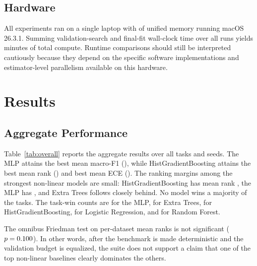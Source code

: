 \documentclass{ieeeaccess}
\begin{document}
\subsection{Hardware}
All experiments ran on a single \HardwareCPU{} laptop with \HardwareRAM{} of unified memory running macOS 26.3.1. Summing validation-search and final-fit wall-clock time over all runs yields \BenchmarkWallMinutes{} minutes of total compute. Runtime comparisons should still be interpreted cautiously because they depend on the specific software implementations and estimator-level parallelism available on this hardware.

\section{Results}
\subsection{Aggregate Performance}
Table~\ref{tab:overall} reports the aggregate results over all tasks and seeds. The MLP attains the best mean macro-F1 (\BestMacroFOneValue{}), while HistGradientBoosting attains the best mean rank (\BestMeanRank{}) and best mean ECE (\BestECEValue{}). The ranking margins among the strongest non-linear models are small: HistGradientBoosting has mean rank \BestMeanRank{}, the MLP has \MLPMeanRank{}, and Extra Trees follows closely behind. No model wins a majority of the \DatasetCount{} tasks. The task-win counts are \MLPTaskWins{} for the MLP, \ExtraTreesTaskWins{} for Extra Trees, \HGBTaskWins{} for HistGradientBoosting, \LogisticTaskWins{} for Logistic Regression, and \RandomForestTaskWins{} for Random Forest.

\begin{table}[!t]
\caption{Aggregate benchmark results across all tasks and seeds. Lower is better for rank, Brier, ECE, and time.}
\label{tab:overall}
\centering
\scriptsize
\resizebox{\columnwidth}{!}{}
\end{table}

The omnibus Friedman test on per-dataset mean ranks is not significant ($p=0.100$). In other words, after the benchmark is made deterministic and the validation budget is equalized, the suite does not support a claim that one of the top non-linear baselines clearly dominates the others.
\end{document}
